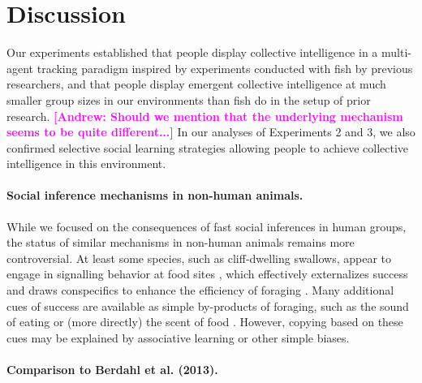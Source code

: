 \documentclass[12pt,letterpaper]{article}
\newcommand{\andrew}[1]{\textcolor{magenta}{\bf [Andrew: #1]}}
\begin{document}
\section{Discussion}

Our experiments established that people display collective intelligence in a multi-agent tracking paradigm inspired by experiments conducted with fish by previous researchers, and that people display emergent collective intelligence at much smaller group sizes in our environments than fish do in the setup of prior research. \andrew{Should we mention that the underlying mechanism seems to be quite different...}  In our analyses of Experiments 2 and 3, we also confirmed selective social learning strategies allowing people to achieve collective intelligence in this environment.

\paragraph{Social inference mechanisms in non-human animals.}


While we focused on the consequences of fast social inferences in human groups, the status of similar mechanisms in non-human animals remains more controversial.
At least some species, such as cliff-dwelling swallows, appear to engage in signalling behavior at food sites \cite{brown1988social,brown1991food}, which effectively externalizes success and draws conspecifics to enhance the efficiency of foraging \cite{torney2011signalling}.
Many additional cues of success are available as simple by-products of foraging, such as the sound of eating or (more directly) the scent of food \cite{galef2001social}.
However, copying based on these cues may be explained by associative learning or other simple biases.

\paragraph{Comparison to Berdahl et al. (2013).}
\end{document}
